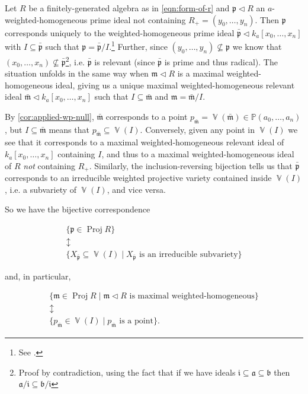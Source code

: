 \documentclass[10pt,notitlepage]{article}
\numberwithin{equation}{subsection}
\DeclareMathOperator{\proj}{Proj}
\DeclareMathOperator{\van}{\mathbb{V}}
\newcommand{\pee}{\mathbb{P}}
\newcommand{\kazn}{k_a[x_0,\ldots,x_n]}
\newcommand{\pazn}{\pee(a_0,\ldots,a_n)}
\newcommand{\prid}{\mathfrak{p}}
\newcommand{\maid}{\mathfrak{m}}
\begin{document}
    Let $R$ be a finitely-generated algebra as in \cref{eqn:form-of-r} and $\prid\triangleleft R$ an $a$-weighted-homogeneous prime ideal not containing $R_+=(y_0,\ldots,y_n)$.
    Then $\prid$ corresponds uniquely to the weighted-homogeneous prime ideal $\bar{\prid}\triangleleft\kazn$ with $I\subseteq\bar{\prid}$ such that $\prid=\bar{\prid}/I$.\footnote{%
        See \cite[Chapter~III,~Section~8,~Theorem~11]{Zariski:1958ue}.
    }
    Further, since $(y_0,\ldots,y_n)\not\subseteq\prid$ we know that $(x_0,\ldots,x_n)\not\subseteq\bar{\prid}$\footnote{%
        Proof by contradiction, using the fact that if we have ideals $\mathfrak{i}\subseteq\mathfrak{a}\subseteq\mathfrak{b}$ then $\mathfrak{a}/\mathfrak{i}\subseteq\mathfrak{b}/\mathfrak{i}$
    }, i.e. $\bar{\prid}$ is relevant (since $\bar{\prid}$ is prime and thus radical).
    The situation unfolds in the same way when $\maid\triangleleft R$ is a maximal weighted-homogeneous ideal, giving us a unique maximal weighted-homogeneous relevant ideal $\bar{\maid}\triangleleft\kazn$ such that $I\subseteq\bar{\maid}$ and $\maid=\bar{\maid}/I$.

    By \cref{cor:applied-wp-null}, $\bar{\maid}$ corresponds to a point $p_{\bar{\maid}}=\van(\bar{\maid})\in\pazn$, but $I\subseteq\bar{\maid}$ means that $p_{\bar{\maid}}\subseteq\van(I)$.
    Conversely, given any point in $\van(I)$ we see that it corresponds to a maximal weighted-homogeneous relevant ideal of $\kazn$ containing $I$, and thus to a maximal weighted-homogeneous ideal of $R$ \emph{not} containing $R_+$.
    Similarly, the inclusion-reversing bijection tells us that $\bar{\prid}$ corresponds to an irreducible weighted projective variety contained inside $\van(I)$, i.e. a subvariety of $\van(I)$, and vice versa.

    So we have the bijective correspondence

    \begin{equation}\label{eqn:proj-corres-1}
        \begin{array}{c}
            \{\prid\in\proj R\}\\
            \updownarrow\\
            \{X_{\bar{\prid}}\subseteq\van(I) \mid X_{\bar{\prid}}\text{ is an irreducible subvariety}\}
        \end{array}
    \end{equation}

    and, in particular,

    \begin{equation}\label{eqn:proj-corres-2}
        \begin{array}{c}
            \{\maid\in\proj R \mid \maid\triangleleft R\text{ is maximal weighted-homogeneous}\}\\
            \updownarrow\\
            \{p_{\bar{\maid}}\in\van(I) \mid p_{\bar{\maid}}\text{ is a point}\}.
        \end{array}
    \end{equation}
\end{document}
